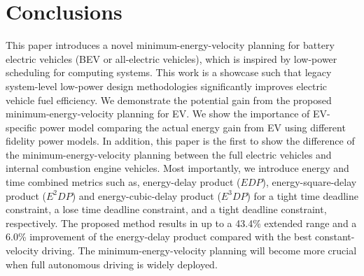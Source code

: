 \documentclass{IEEEtran}
\begin{document}
\section{Conclusions} \label{sec:conclusions}

This paper introduces a novel minimum-energy-velocity planning for battery electric vehicles (BEV or all-electric vehicles), which is inspired by low-power scheduling for computing systems. This work is a showcase such that legacy system-level  low-power design methodologies significantly improves electric vehicle fuel efficiency. We demonstrate the potential gain from the proposed minimum-energy-velocity planning for EV. We show the importance of EV-specific power model  comparing the actual energy gain from EV using different fidelity power models. In addition, this paper is the first to show the difference of the minimum-energy-velocity planning between the full electric vehicles and internal combustion engine vehicles. Most importantly, we introduce energy and time combined metrics such as, energy-delay product ($EDP$), energy-square-delay product ($E^2DP$) and energy-cubic-delay product ($E^3DP$) for a tight time deadline constraint, a lose time deadline constraint, and a tight deadline constraint, respectively. 
The proposed method results in up to a 43.4\% extended range and a  6.0\% improvement of the energy-delay product compared with the best constant-velocity driving. 
The minimum-energy-velocity planning will become more crucial when full autonomous driving is widely deployed.


%




\end{document}
